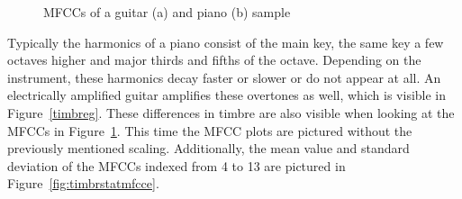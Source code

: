 \begin{figure}[htbp]
	\centering
	\caption{MFCCs of a guitar (a) and piano (b) sample}	
	\label{fig:timbrmfcce}
\end{figure}
\FloatBarrier
\noindent Typically the harmonics of a piano consist of the main key, the same key a few octaves higher and major thirds and fifths of the octave. Depending on the instrument, these harmonics decay faster or slower or do not appear at all. An electrically amplified guitar amplifies these overtones as well, which is visible in Figure~\ref{timbreg}.
\noindent These differences in timbre are also visible when looking at the MFCCs in Figure~\ref{fig:timbrmfcce}. This time the MFCC plots are pictured without the previously mentioned scaling. Additionally, the mean value and standard deviation of the MFCCs indexed from 4 to 13 are pictured in Figure~\ref{fig:timbrstatmfcce}. 
